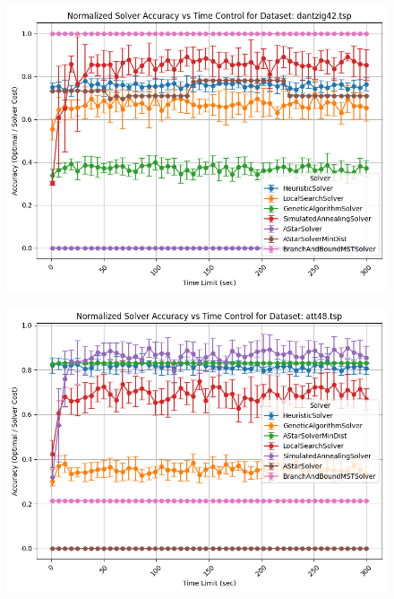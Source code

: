 \documentclass[11pt]{article}
\begin{document}
	\begin{figure}[H]
		\centering
		\includegraphics[width=0.7\linewidth]{figures/accuracy_line_dantzig42.tsp}
		\caption{}
		\label{fig:accuracylinedantzig42}
	\end{figure}
	\begin{figure}[H]
		\centering
		\includegraphics[width=0.7\linewidth]{figures/accuracy_line_att48.tsp}
		\caption{}
		\label{fig:accuracylineatt48}
	\end{figure}
	
\end{document}
